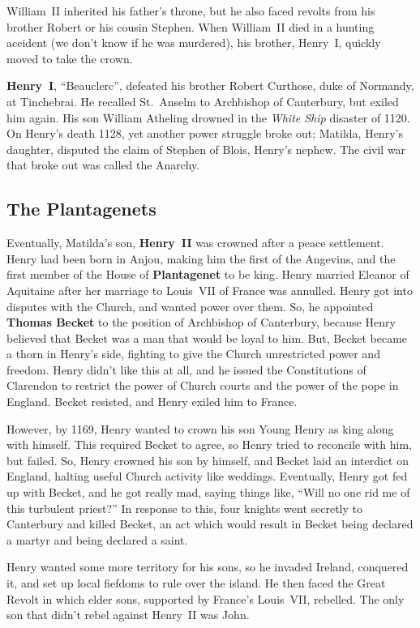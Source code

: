 William~II inherited his father's throne,
but he also faced revolts from his brother Robert or his cousin Stephen.
When William~II died in a hunting accident (we don't know if he was murdered),
his brother, Henry~I, quickly moved to take the crown.

\textbf{Henry~I}, ``Beauclerc'', defeated his brother Robert Curthose, duke of Normandy, at Tinchebrai.
He recalled St.\ Anselm to Archbishop of Canterbury, but exiled him again.
His son William Atheling drowned in the \textit{White Ship} disaster of 1120.
On Henry's death 1128, yet another power struggle broke out;
Matilda, Henry's daughter, disputed the claim of Stephen of Blois, Henry's nephew.
The civil war that broke out was called the Anarchy.

\subsection*{The Plantagenets}

Eventually, Matilda's son, \textbf{Henry~II} was crowned after a peace settlement.
Henry had been born in Anjou, making him the first of the Angevins,
and the first member of the House of \textbf{Plantagenet} to be king.
Henry married Eleanor of Aquitaine after her marriage to Louis~VII of France was annulled.
Henry got into disputes with the Church, and wanted power over them.
So, he appointed \textbf{Thomas Becket} to the position of Archbishop of Canterbury,
because Henry believed that Becket was a man that would be loyal to him.
But, Becket became a thorn in Henry's side, fighting to give the Church unrestricted power and freedom.
Henry didn't like this at all, and he issued the Constitutions of Clarendon
to restrict the power of Church courts and the power of the pope in England.
Becket resisted, and Henry exiled him to France.

However, by 1169, Henry wanted to crown his son Young Henry as king along with himself.
This required Becket to agree, so Henry tried to reconcile with him, but failed.
So, Henry crowned his son by himself, and Becket laid an interdict on England,
halting useful Church activity like weddings.
Eventually, Henry got fed up with Becket, and he got really mad, saying things like,
``Will no one rid me of this turbulent priest?''
In response to this, four knights went secretly to Canterbury and killed Becket,
an act which would result in Becket being declared a martyr and being declared a saint.

Henry wanted some more territory for his sons, so he invaded Ireland, conquered it,
and set up local fiefdoms to rule over the island.
He then faced the Great Revolt in which elder sons, supported by France's Louis~VII, rebelled.
The only son that didn't rebel against Henry~II was John.

